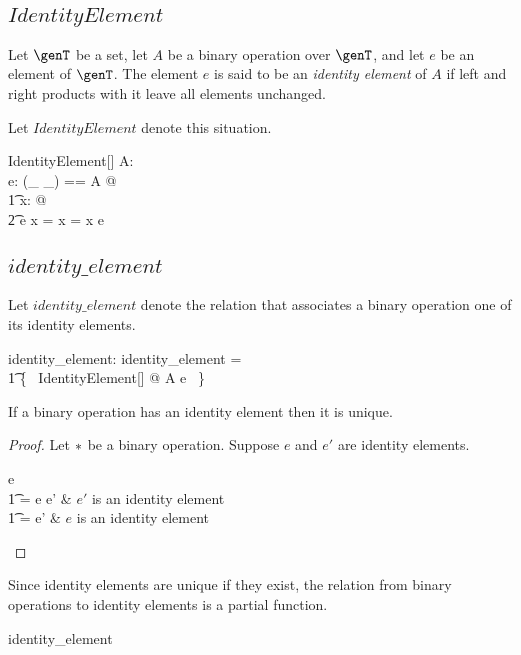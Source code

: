 \documentclass{amsart}
\begin{document}
\subsection{$IdentityElement$}

Let $\genT$ be a set, let $A$ be a binary operation over $\genT$, and let $e$ be an element of $\genT$.
The element $e$ is said to be an {\em identity element} of $A$ if left and right 
products with it leave all elements unchanged.

Let $IdentityElement$ denote this situation.

\begin{schema}{IdentityElement}[\genT]
A: \binop \genT \\
e: \genT
\where
\LET (\_ \mulG \_) == A @ \\
\t1	\forall x: \genT @ \\
\t2		e \mulG x = x = x \mulG e
\end{schema}

\subsection{$identity\_element$}

Let $identity\_element$ denote the relation that associates a binary operation one of its identity elements.

\begin{gendef}[\genT]
identity\_element: \binop \genT \rel \genT
\where
identity\_element = \\
\t1	\{~ IdentityElement[\genT] @ A \mapsto e ~\}
\end{gendef}

\begin{remark}
If a binary operation has an identity element then it is unique.
\end{remark}

\begin{proof}
Let $\mathbin{*}$ be a binary operation. Suppose $e$ and $e'$ are identity elements.
\begin{argue}
e \\
\t1	= e \mulG e'	& $e'$ is an identity element \\
\t1	= e'			& $e$ is an identity element
\end{argue}
\end{proof}

\begin{remark}
Since identity elements are unique if they exist, the relation from binary operations to identity elements is a partial function.

\begin{zed}
identity\_element \in \binop \setT \pfun \setT
\end{zed}

\end{remark}
\end{document}

